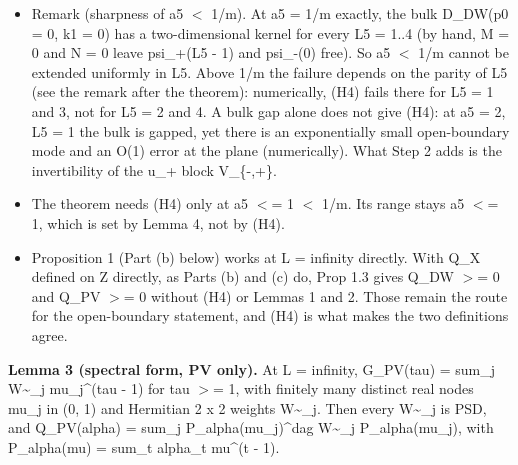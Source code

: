 \documentclass[11pt,a4paper]{article}
\begin{document}
\begin{itemize}
\begin{itemize}
diag(V\_\{-,+\}, V\_\{+,-\}), so the error at fixed distance from the plane is O(lambda\_max\textasciicircum{}(2L)).
\item{} Remark (sharpness of a5 $<$ 1/m). At a5 = 1/m exactly, the bulk D\_DW(p0 = 0, k1 = 0) has a two-dimensional
kernel for every L5 = 1..4 (by hand, M = 0 and N = 0 leave psi\_+(L5 - 1) and
psi\_-(0) free). So a5 $<$ 1/m cannot be extended uniformly in L5. Above 1/m the failure depends on the parity of
L5 (see the remark after the theorem): numerically, (H4) fails there for L5 = 1 and 3, not for L5 = 2 and 4. A
bulk gap alone does not give (H4): at a5 = 2, L5 = 1 the bulk is gapped, yet there is an exponentially small
open-boundary mode and an O(1) error at the plane (numerically). What Step 2 adds is the invertibility of the
u\_+ block V\_\{-,+\}.
\item{} The theorem needs (H4) only at a5 $<$= 1 $<$ 1/m. Its range stays a5 $<$= 1, which is set by Lemma 4, not by (H4).
\item{} Proposition 1 (Part (b) below) works at L = infinity directly. With Q\_X defined on Z directly, as Parts (b) and (c) do, Prop 1.3 gives Q\_DW $>$= 0 and
Q\_PV $>$= 0 without (H4) or Lemmas 1 and 2. Those remain the route for the open-boundary statement, and (H4) is
what makes the two definitions agree.
\end{itemize}

\end{itemize}

{\bfseries\boldmath Lemma 3 (spectral form, PV only).} At L = infinity,
G\_PV(tau) = sum\_j W\textasciitilde{}\_j mu\_j\textasciicircum{}(tau - 1) for tau $>$= 1, with finitely many distinct real nodes mu\_j in (0, 1) and
Hermitian 2 x 2 weights W\textasciitilde{}\_j. Then every W\textasciitilde{}\_j is PSD, and Q\_PV(alpha) = sum\_j P\_alpha(mu\_j)\textasciicircum{}dag W\textasciitilde{}\_j P\_alpha(mu\_j),
with P\_alpha(mu) = sum\_t alpha\_t mu\textasciicircum{}(t - 1).
\end{document}
